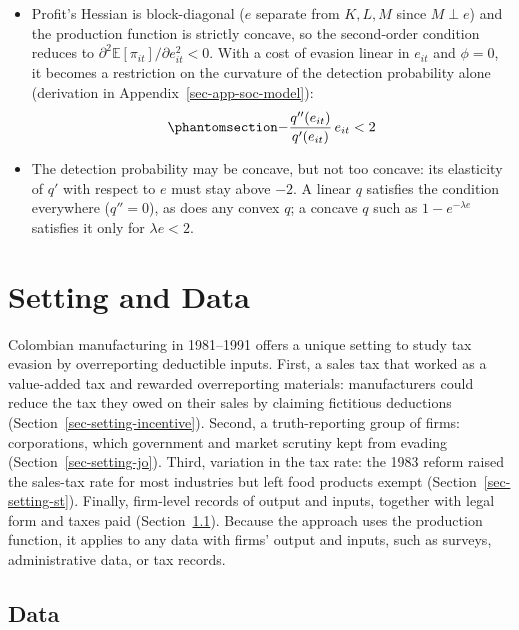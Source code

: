 \documentclass[
  12pt,
  letterpaper,
  oneside,
  openany]{report}
\providecommand{\tightlist}{%
  \setlength{\itemsep}{0pt}\setlength{\parskip}{0pt}}
\begin{document}
\begin{itemize}
\tightlist
\item
  Profit's Hessian is block-diagonal (\(e\) separate from \(K,L,M\)
  since \(M\perp e\)) and the production function is strictly concave,
  so the second-order condition reduces to
  \(\partial^2\mathbb{E}[\pi_{it}]/\partial e_{it}^2<0\). With a cost of
  evasion linear in \(e_{it}\) and \(\phi=0\), it becomes a restriction
  on the curvature of the detection probability alone (derivation in
  Appendix~\ref{sec-app-soc-model}):
  \begin{equation}\protect\phantomsection\label{eq-soc}{
  -\frac{q''(e_{it})}{q'(e_{it})}\,e_{it}<2
  }\end{equation}
\item
  The detection probability may be concave, but not too concave: its
  elasticity of \(q'\) with respect to \(e\) must stay above \(-2\). A
  linear \(q\) satisfies the condition everywhere (\(q''=0\)), as does
  any convex \(q\); a concave \(q\) such as \(1-e^{-\lambda e}\)
  satisfies it only for \(\lambda e<2\).
\end{itemize}


\chapter{Setting and Data}\label{sec-setting}

Colombian manufacturing in 1981--1991 offers a unique setting to study
tax evasion by overreporting deductible inputs. First, a sales tax that
worked as a value-added tax and rewarded overreporting materials:
manufacturers could reduce the tax they owed on their sales by claiming
fictitious deductions (Section~\ref{sec-setting-incentive}). Second, a
truth-reporting group of firms: corporations, which government and
market scrutiny kept from evading (Section~\ref{sec-setting-jo}). Third,
variation in the tax rate: the 1983 reform raised the sales-tax rate for
most industries but left food products exempt
(Section~\ref{sec-setting-st}). Finally, firm-level records of output
and inputs, together with legal form and taxes paid
(Section~\ref{sec-setting-data}). Because the approach uses the
production function, it applies to any data with firms' output and
inputs, such as surveys, administrative data, or tax records.

\section{Data}\label{sec-setting-data}
\end{document}
